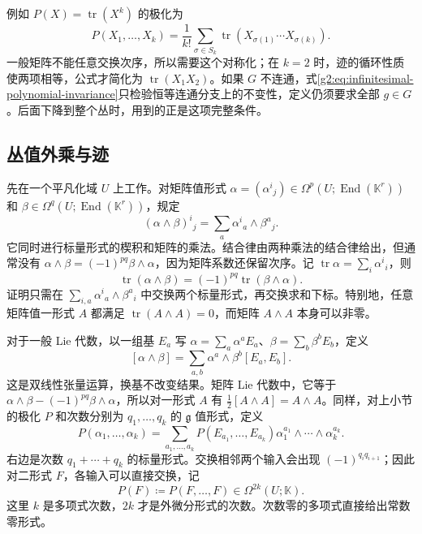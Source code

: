 例如 \(P(X)=\operatorname{tr}(X^k)\) 的极化为
\[
	P(X_1,\ldots,X_k)=\frac1{k!}\sum_{\sigma\in S_k}
	\operatorname{tr}(X_{\sigma(1)}\cdots X_{\sigma(k)}).
\]
一般矩阵不能任意交换次序，所以需要这个对称化；在 \(k=2\) 时，迹的循环性质使两项相等，公式才简化为 \(\operatorname{tr}(X_1X_2)\)。如果 \(G\) 不连通，式\eqref{g2:eq:infinitesimal-polynomial-invariance}只检验恒等连通分支上的不变性，定义仍须要求全部 \(g\in G\)。后面下降到整个丛时，用到的正是这项完整条件。

\subsection{丛值外乘与迹}
\label{g2:subsec:2201:02}
先在一个平凡化域 \(U\) 上工作。对矩阵值形式 \(\alpha=(\alpha^i{}_j)\in\Omega^p(U;\operatorname{End}(\mathbb K^r))\) 和 \(\beta\in\Omega^q(U;\operatorname{End}(\mathbb K^r))\)，规定
\begin{equation}\label{g2:eq:matrix-form-product}
	(\alpha\wedge\beta)^i{}_j=\sum_a\alpha^i{}_a\wedge\beta^a{}_j.
\end{equation}
它同时进行标量形式的楔积和矩阵的乘法。结合律由两种乘法的结合律给出，但通常没有 \(\alpha\wedge\beta=(-1)^{pq}\beta\wedge\alpha\)，因为矩阵系数还保留次序。记 \(\operatorname{tr}\alpha=\sum_i\alpha^i{}_i\)，则
\begin{equation}\label{g2:eq:graded-trace-cyclicity}
	\operatorname{tr}(\alpha\wedge\beta)=(-1)^{pq}\operatorname{tr}(\beta\wedge\alpha).
\end{equation}
证明只需在 \(\sum_{i,a}\alpha^i{}_a\wedge\beta^a{}_i\) 中交换两个标量形式，再交换求和下标。特别地，任意矩阵值一形式 \(A\) 都满足 \(\operatorname{tr}(A\wedge A)=0\)，而矩阵 \(A\wedge A\) 本身可以非零。

\ProseParagraphBreak

对于一般 Lie 代数，以一组基 \(E_a\) 写 \(\alpha=\sum_a\alpha^aE_a\)、\(\beta=\sum_b\beta^bE_b\)，定义
\[
	[\alpha\wedge\beta]=\sum_{a,b}\alpha^a\wedge\beta^b[E_a,E_b].
\]
这是双线性张量运算，换基不改变结果。矩阵 Lie 代数中，它等于 \(\alpha\wedge\beta-(-1)^{pq}\beta\wedge\alpha\)，所以对一形式 \(A\) 有 \(\tfrac12[A\wedge A]=A\wedge A\)。同样，对上小节的极化 \(P\) 和次数分别为 \(q_1,\ldots,q_k\) 的 \(\mathfrak g\) 值形式，定义
\begin{equation}\label{g2:eq:polynomial-on-bundle-forms}
	P(\alpha_1,\ldots,\alpha_k)
	=\sum_{a_1,\ldots,a_k}P(E_{a_1},\ldots,E_{a_k})
	\alpha_1^{a_1}\wedge\cdots\wedge\alpha_k^{a_k}.
\end{equation}
右边是次数 \(q_1+\cdots+q_k\) 的标量形式。交换相邻两个输入会出现 \((-1)^{q_iq_{i+1}}\)；因此对二形式 \(F\)，各输入可以直接交换，记
\[
	P(F)\coloneqq P(F,\ldots,F)\in\Omega^{2k}(U;\mathbb K).
\]
这里 \(k\) 是多项式次数，\(2k\) 才是外微分形式的次数。次数零的多项式直接给出常数零形式。

